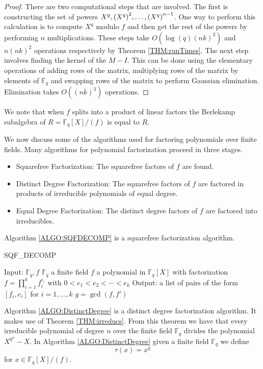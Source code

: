 \documentclass{article}
\let\originalleft\left
\let\originalright\right
\renewcommand{\left}{\mathopen{}\mathclose\bgroup\originalleft}
\renewcommand{\right}{\aftergroup\egroup\originalright}
\theoremstyle{plain}
\theoremstyle{definition}
\def\Fq {{ \mathbb{F} _ {q} }}
\begin{document}
		\begin{proof}
		    There are two computational steps that are involved. The first is constructing the set of powers $X^q,\left(X^{q} \right)^2,\ldots,\left(X^{q} \right)^{n-1}$. One way to perform this calculation is to compute $X^q$ modulo $f$ and then get the rest of the powers by performing $n$ multiplications. These steps take $O(\log(q)(nk)^2)$ and $n(nk)^2$ operations respectively by Theorem \ref{THM:runTimes}. The next step involves finding the kernel of the $M-I$. This can be done using the elementary operations of adding rows of the matrix, multiplying rows of the matrix by elements of $\Fq$ and swapping rows of the matrix to perform Gaussian elimination. Elimination takes $O((nk)^3)$ operations. 
		\end{proof}	
		We note that when $f$ splits into a product of linear factors the Berlekamp subalgebra of $R = \Fq[X]/(f)$ is equal to $R$. 
		
		We now discuss some of the algorithms used for factoring polynomials over finite fields. Many algorithms for polynomial factorization proceed in three stages. 
		\begin{itemize}
		    \item Squarefree Factorization: The squarefree factors of $f$ are found.
				\item Distinct Degree Factorization: The squarefree factors of $f$ are factored in products of irreducible polynomials of equal degree.
				\item Equal Degree Factorization: The distinct degree factors of $f$ are factored into irreducibles. 
		\end{itemize}
		Algorithm \ref{ALGO:SQFDECOMP} is a squarefree factorization algorithm. 
		
		\begin{singlespace}
		\begin{algorithm}[H] 
		\DontPrintSemicolon
		\label{ALGO:SQFDECOMP}
		\caption{SQF\_DECOMP}
				Input: $\Fq,f$ \;
				\hspace{2mm} $\Fq$ a finite field \;
				\hspace{2mm} $f$ a polynomial in $\Fq[X]$ with factorization $f=\prod_{i=1}^k{f_i^{e_i}}$ with $0<e_1<e_2<\cdots<e_k$ \;
				Output: a list of pairs of the form $[f_i,e_i]$ for $i=1,\ldots,k$ \;
				\;
		    $g=\gcd(f,f')$ \;
    \end{algorithm}
		\end{singlespace} 
		\vspace{5mm}		
		Algorithm \ref{ALGO:DistinctDegree} is a distinct degree factorization algorithm. It makes use of Theorem \ref{THM:irreducs}. From this theorem we have that every irreducible polynomial of degree $n$ over the finite field $\Fq$ divides the polynomial $X^{q^n}-X$. In Algorithm \ref{ALGO:DistinctDegree} given a finite field $\Fq$ we define
		\[ \tau(x)=x^q\] 
    \noindent for $x \in \Fq[X]/(f)$. 
\end{document}
